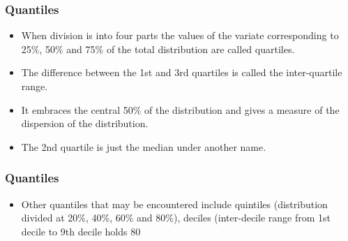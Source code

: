 \documentclass{beamer}
\begin{document}
\begin{frame}
\frametitle{Quantiles}
\Large
\vspace{-1cm}
\begin{itemize}
\item When division is into four parts the values of the variate corresponding to 25\%, 50\% and 75\% of the total 
distribution are called quartiles.\item The difference between the 1st and 3rd quartiles is called the inter-quartile range. 
\item It embraces the central 50\% of the distribution and gives a measure of the dispersion of the distribution. 
\item The 2nd quartile is just the median under another name.
\end{itemize}
\end{frame}
\begin{frame}
\frametitle{Quantiles}
\Large
\vspace{-1cm}
\begin{itemize}
\item Other quantiles that may be encountered include quintiles (distribution divided at 20\%, 40\%, 60\% and 80\%), 
deciles (inter-decile range from 1st decile to 9th decile holds 80%
\end{itemize}
\end{frame}
\end{document}

